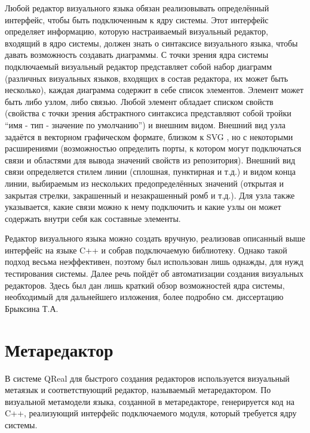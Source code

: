 Любой редактор визуального языка обязан реализовывать определённый интерфейс, чтобы 
быть подключенным к ядру системы. Этот интерфейс определяет информацию, которую настраиваемый 
визуальный редактор, входящий в ядро системы, должен знать о синтаксисе визуального 
языка, чтобы давать возможность создавать диаграммы. С точки зрения ядра системы подключаемый 
визуальный редактор представляет собой набор диаграмм (различных визуальных языков, 
входящих в состав редактора, их может быть несколько), каждая диаграмма содержит в 
себе список элементов. Элемент может быть либо узлом, либо связью. Любой элемент обладает 
списком свойств (свойства с точки зрения абстрактного синтаксиса представляют собой 
тройки "`имя - тип - значение по умолчанию"') и внешним видом. Внешний вид узла задаётся в векторном графическом формате, близком к SVG
, но с некоторыми расширениями (возможностью определить порты, к котором могут подключаться связи и областями для вывода значений 
свойств из репозитория). Внешний вид связи определяется стилем линии (сплошная, пунктирная 
и т.д.) и видом конца линии, выбираемым из нескольких предопределённых значений (открытая 
и закрытая стрелки, закрашенный и незакрашенный ромб и т.д.). Для узла также указывается, 
какие связи можно к нему подключить и какие узлы он может содержать внутри себя как 
составные элементы.

Редактор визуального языка можно создать вручную, реализовав описанный выше интерфейс 
на языке C++ и собрав подключаемую библиотеку. Однако такой подход весьма неэффективен, 
поэтому был использован лишь однажды, для нужд тестирования системы. Далее речь пойдёт 
об автоматизации создания визуальных редакторов. Здесь был дан лишь краткий обзор 
возможностей ядра системы, необходимый для дальнейшего изложения, более подробно 
см. диссертацию Брыксина Т.А.

\section{Метаредактор}
В системе QReal для быстрого создания редакторов используется визуальный метаязык и 
соответствующий редактор, называемый метаредактором. По визуальной метамодели языка, 
созданной в метаредакторе, генерируется код на C++, реализующий интерфейс подключаемого 
модуля, который требуется ядру системы.

